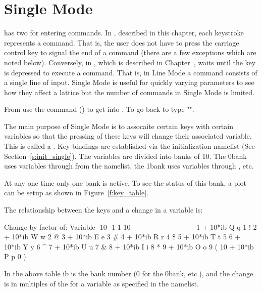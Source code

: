 \chapter{Single Mode}
\label{c:single}

\tao has two  for entering commands. In ,
described in this chapter, each keystroke represents a command.  That
is, the user does not have to press the carriage control key to signal
the end of a command (there are a few exceptions which are noted
below). Conversely, in , which is described in
Chapter~, \tao waits until the  key is
depressed to execute a command. That is, in Line Mode a command
consists of a single line of input.  Single Mode is useful for quickly
varying parameters to see how they affect a lattice but the number of
commands in Single Mode is limited.

From  use the  command ()
to get into . To go back to  type
"".

The main purpose of Single Mode is to assocaite certain keys with
certain variables so that the pressing of these keys will change their
associated variable. This is called a .  Key bindings
are established via the  initialization namelist (See
Section~\ref{s:init_single}). The variables are divided into banks of
10. The 0\Th bank uses variables  through  from
the  namelist, the 1\St bank uses variables
 through , etc.  

At any one time only one bank is active. To see the status of this
bank, a  plot can be setup as shown in
Figure~\ref{f:key_table}.

The relationship between the keys and a change in a
variable is:
\begin{example}
                 Change by factor of:          
     Variable    -10  -1    1   10
   ----------    ---  ---  ---  ---
    1 + 10*ib     Q    q    1    !   
    2 + 10*ib     W    w    2    @    
    3 + 10*ib     E    e    3    \#   
    4 + 10*ib     R    r    4    \$   
    5 + 10*ib     T    t    5    %
    6 + 10*ib     Y    y    6    ^   
    7 + 10*ib     U    u    7    \&
    8 + 10*ib     I    i    8    *   
    9 + 10*ib     O    o    9    (   
   10 + 10*ib     P    p    0    )   
\end{example}
In the above table ib is the bank number (0 for the 0\Th bank, etc.),
and the change is in multiples of the  for a variable as
specified in the  namelist. 

